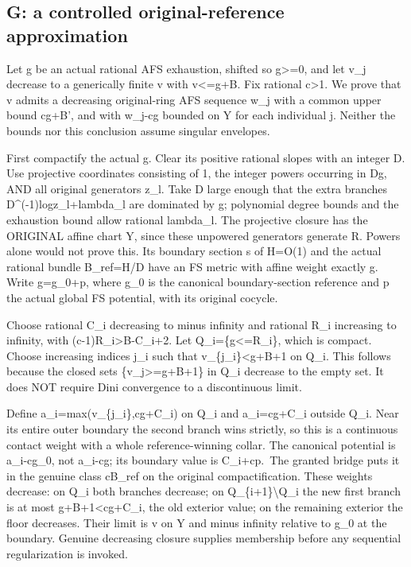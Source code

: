 \documentclass[
  10pt,
]{article}
\begin{document}
\subsection{G: a controlled original-reference
approximation}\label{g-a-controlled-original-reference-approximation}

Let g be an actual rational AFS exhaustion, shifted so g\textgreater=0,
and let v\_j decrease to a generically finite v with v\textless=g+B. Fix
rational c\textgreater1. We prove that v admits a decreasing
original-ring AFS sequence w\_j with a common upper bound cg+B', and
with \textbar w\_j-cg\textbar{} bounded on Y for each individual j.
Neither the bounds nor this conclusion assume singular envelopes.

First compactify the actual g. Clear its positive rational slopes with
an integer D. Use projective coordinates consisting of 1, the integer
powers occurring in Dg, AND all original generators z\_l. Take D large
enough that the extra branches
D\^{}(-1)log\textbar z\_l\textbar+lambda\_l are dominated by g;
polynomial degree bounds and the exhaustion bound allow rational
lambda\_l. The projective closure has the ORIGINAL affine chart Y, since
these unpowered generators generate R. Powers alone would not prove
this. Its boundary section s of H=O(1) and the actual rational bundle
B\_ref=H/D have an FS metric with affine weight exactly g. Write
g=g\_0+p, where g\_0 is the canonical boundary-section reference and p
the actual global FS potential, with its original cocycle.

Choose rational C\_i decreasing to minus infinity and rational R\_i
increasing to infinity, with (c-1)R\_i\textgreater B-C\_i+2. Let
Q\_i=\{g\textless=R\_i\}, which is compact. Choose increasing indices
j\_i such that v\_\{j\_i\}\textless g+B+1 on Q\_i. This follows because
the closed sets \{v\_j\textgreater=g+B+1\} in Q\_i decrease to the empty
set. It does NOT require Dini convergence to a discontinuous limit.

Define a\_i=max(v\_\{j\_i\},cg+C\_i) on Q\_i and a\_i=cg+C\_i outside
Q\_i. Near its entire outer boundary the second branch wins strictly, so
this is a continuous contact weight with a whole reference-winning
collar. The canonical potential is a\_i-cg\_0, not a\_i-cg; its boundary
value is C\_i+cp.~The granted bridge puts it in the genuine class
cB\_ref on the original compactification. These weights decrease: on
Q\_i both branches decrease; on Q\_\{i+1\}\textbackslash Q\_i the new
first branch is at most g+B+1\textless cg+C\_i, the old exterior value;
on the remaining exterior the floor decreases. Their limit is v on Y and
minus infinity relative to g\_0 at the boundary. Genuine decreasing
closure supplies membership before any sequential regularization is
invoked.
\end{document}
